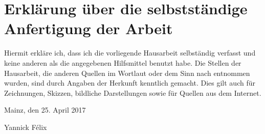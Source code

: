 \documentclass[a4paper,12pt,ngerman,listof=numbered]{scrartcl}      %
\let\oldcite\cite
\renewcommand{\cite}[1]{\textsuperscript{\oldcite{#1}}}
\begin{document}
	\newpage
	\section{Erklärung über die selbstständige Anfertigung der Arbeit}
	Hiermit erkläre ich, dass ich die vorliegende Hausarbeit selbständig verfasst und keine anderen als die angegebenen Hilfsmittel benutzt habe.
	Die Stellen der Hausarbeit, die anderen Quellen im Wortlaut oder dem Sinn nach entnommen wurden, sind durch Angaben der Herkunft kenntlich gemacht. Dies gilt auch für Zeichnungen, Skizzen, bildliche Darstellungen sowie für Quellen aus dem Internet.\cite{erklaerung}\par
	\vspace{0.5cm}
	\noindent Mainz, den 25. April 2017\par
	\vspace{2cm}
	\noindent Yannick F\'{e}lix
	\vfill
	\doclicenseThis
	
\end{document}
